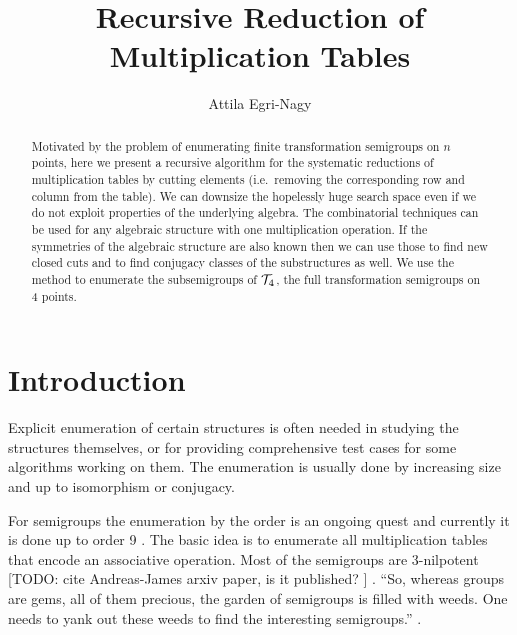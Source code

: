 \documentclass{article}
\author{Attila Egri-Nagy}
\title{Recursive Reduction of Multiplication Tables}
\theoremstyle{plain}
\theoremstyle{definition}
\newcommand{\cT}{{\cal T}}
\newcommand{\todo}[1]{ \small \textsf{[TODO:  #1 ]} \normalsize}
\begin{document}
\maketitle


\begin{abstract}
Motivated by the problem of enumerating finite transformation semigroups on $n$ points, here we present a recursive algorithm for the systematic reductions of multiplication tables by cutting elements (i.e.\ removing the corresponding row and column from the table).
We can downsize the hopelessly huge search space even if we do not exploit properties of the underlying algebra. 
The combinatorial techniques can be used for any algebraic structure with one multiplication operation. If the symmetries of the algebraic structure are also known then we can use those to find new closed cuts and to find conjugacy classes of the substructures as well. 
We use the method to enumerate the subsemigroups of $\cT_4$, the full transformation semigroups on 4 points. 
\end{abstract}

\section{Introduction}
Explicit enumeration of certain structures is often needed in studying the structures themselves, or for providing comprehensive test cases  for some algorithms working on them.
The enumeration is usually done by increasing size and up to isomorphism or conjugacy. 

For semigroups the enumeration by the order is an ongoing quest and currently it is done up to order 9 \cite{smallsemi}. The basic idea is to enumerate all multiplication tables that encode an associative operation. %
Most of the semigroups are 3-nilpotent \todo{cite Andreas-James arxiv paper, is it published?}. ``So, whereas groups are
gems, all of them precious, the garden of semigroups is filled with weeds. One
needs to yank out these weeds to find the interesting semigroups.'' \cite{QBook}.
\end{document}

